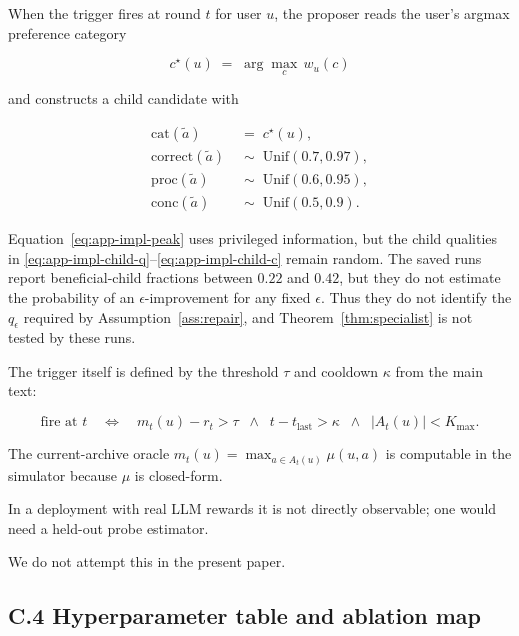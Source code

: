 \documentclass{article} %
\begin{document}
When the trigger fires at round $t$ for user $u$, the proposer reads the user's argmax preference category

\begin{equation}
\label{eq:app-impl-peak}
c^\star(u) \;=\; \arg\max_{c}\, w_u(c)
\end{equation}

and constructs a child candidate with

\begin{align}
\label{eq:app-impl-child-cat}
\mathrm{cat}(\tilde a) &\;=\; c^\star(u),\\
\label{eq:app-impl-child-q}
\mathrm{correct}(\tilde a) &\;\sim\; \mathrm{Unif}(0.7, 0.97),\\
\label{eq:app-impl-child-p}
\mathrm{proc}(\tilde a) &\;\sim\; \mathrm{Unif}(0.6, 0.95),\\
\label{eq:app-impl-child-c}
\mathrm{conc}(\tilde a) &\;\sim\; \mathrm{Unif}(0.5, 0.9).
\end{align}

Equation~\eqref{eq:app-impl-peak} uses privileged information, but the child
qualities in \eqref{eq:app-impl-child-q}--\eqref{eq:app-impl-child-c} remain
random. The saved runs report beneficial-child fractions between \(0.22\) and
\(0.42\), but they do not estimate the probability of an
\(\epsilon\)-improvement for any fixed \(\epsilon\). Thus they do not identify
the \(q_\epsilon\) required by Assumption~\ref{ass:repair}, and
Theorem~\ref{thm:specialist} is not tested by these runs.

The trigger itself is defined by the threshold $\tau$ and cooldown $\kappa$ from the main text:

\begin{equation}
\label{eq:app-impl-trigger}
\text{fire at } t \quad\Longleftrightarrow\quad m_t(u) - r_t > \tau \;\;\wedge\;\; t - t_{\text{last}} > \kappa \;\;\wedge\;\; |A_t(u)| < K_{\max}.
\end{equation}

The current-archive oracle $m_t(u) = \max_{a \in A_t(u)} \mu(u, a)$ is computable in the simulator because $\mu$ is closed-form.

In a deployment with real LLM rewards it is not directly observable; one would need a held-out probe estimator.

We do not attempt this in the present paper.

\subsection{C.4 Hyperparameter table and ablation map}
\end{document}
